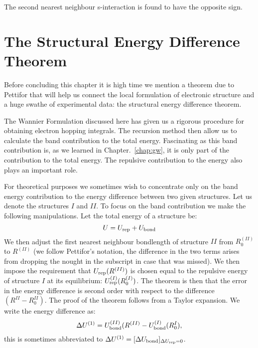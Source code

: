 The second nearest neighbour s-interaction is found to have the opposite sign.

\section{The Structural Energy Difference Theorem}
\label{sec:structendiff}
Before concluding this chapter it is high time we mention a theorem due to Pettifor
that will help us connect the local formulation of electronic structure and
a huge swathe of experimental data: the structural energy difference theorem. 

The Wannier Formulation discussed here has given
us a rigorous procedure for obtaining electron hopping integrals.
The recursion method then allow us to calculate the band contribution to the total energy.
Fascinating as this band contribution is, as we learned in Chapter.~\ref{chap:gw}, 
it is only part of the contribution to the total energy. The repulsive contribution to the energy
also plays an important role. 

For theoretical purposes we sometimes wish to concentrate only on the band energy 
contribution to the energy difference between two given structures. 
Let us denote the structures $I$ and $II$. To focus on the band contribution we make
the following manipulations. Let the total energy of a structure be:
%
\begin{equation}
U = U_{\rm rep} + U_{\rm bond}
\end{equation}
%
We then adjust the first nearest neighbour bondlength of structure $II$ from
$R^{(II)}_{0}$ to $R^{(II)}$ (we follow Pettifor's notation, the difference in the two terms
arises from dropping the nought in the subscript in case that was missed). 
We then impose the requirement that $U_{\rm rep}(R^{(II)})$ is chosen 
equal to the repulsive energy of structure $I$ at its equilibrium: $U^{(I)}_{\rm rep}(R^{(I)}_0)$.
The theorem is then that the error in the energy difference is second order with respect to the 
difference $(R^{II} - R^{II}_{0})$. The proof of the theorem follows from a Taylor expansion. 
We write the energy difference as:
%
\begin{equation}
\Delta U^{(1)} = U^{(II)}_{\rm bond}(R^{(II)} - U_{\rm bond}^{(I)}(R^{I}_{0}),
\end{equation}
%
this is sometimes abbreviated to $\Delta U^{(1)} = [\Delta U_{\rm bond}]_{\Delta U_{\rm rep}=0}$.

